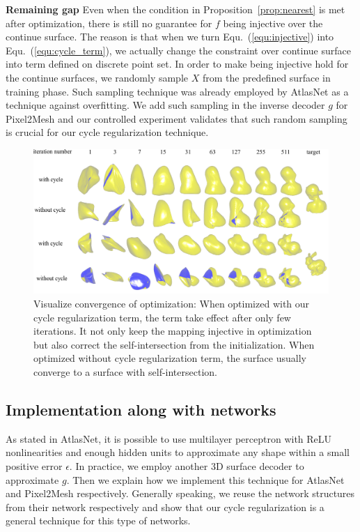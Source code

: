\noindent\textbf{Remaining gap}
Even when the condition in Proposition~\ref{prop:nearest} is met after optimization, there is still no guarantee for $f$ being injective over the continue surface. The reason is that when we turn Equ.~(\ref{equ:injective}) into Equ.~(\ref{equ:cycle_term}), we actually change the constraint over continue surface into term defined on discrete point set. In order to make being injective hold for the continue surfaces, we randomly sample $X$ from the predefined surface in training phase. Such sampling technique was already employed by AtlasNet as a technique against overfitting. We add such sampling in the inverse decoder $g$ for Pixel2Mesh and our controlled experiment validates that such random sampling is crucial for our cycle regularization technique.  
\begin{figure}[htbp]
	\centering
	\includegraphics[width=\linewidth]{img/opt/opt}
	\caption{Visualize convergence of optimization: When optimized with our cycle regularization term, the term take effect after only few iterations. It not only keep the mapping injective in optimization but also correct the self-intersection from the initialization. When optimized without cycle regularization term, the surface usually converge to a surface with self-intersection.}
	\label{fig:opt}
\end{figure}


\subsection{Implementation along with networks}

As stated in AtlasNet\cite{atlasnet}, it is possible to use multilayer perceptron with ReLU nonlinearities and enough hidden units to approximate any shape within a small positive error $\epsilon$. In practice, we employ another 3D surface decoder to approximate $g$. Then we explain how we implement this technique for AtlasNet and Pixel2Mesh respectively. Generally speaking, we reuse the network structures from their network respectively and show that our cycle regularization is a general technique for this type of networks.

